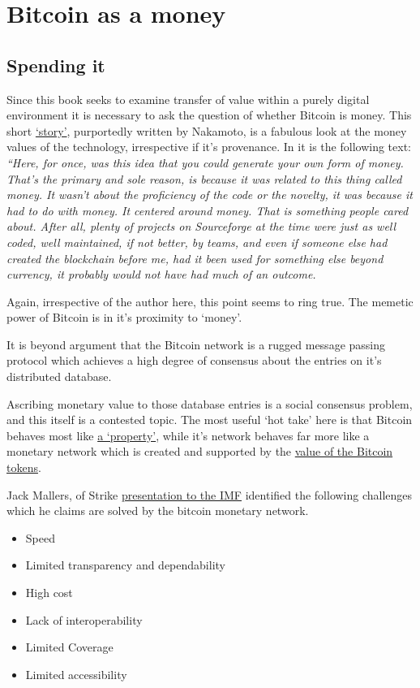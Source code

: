 \section{Bitcoin as a money}
\subsection{Spending it}
Since this book seeks to examine transfer of value within a purely digital environment it is necessary to ask the question of whether Bitcoin is money. This short \href{https://bitcoin-zar.blogspot.com/2018/07/duality-excerpt-by-satoshi-nakomoto.html}{`story'}, purportedly written by Nakamoto, is a fabulous look at the money values of the technology, irrespective if it's provenance. In it is the following text: \textit{``Here, for once, was this idea that you could generate your own form of money. That's the primary and sole reason, is because it was related to this thing called money. It wasn't about the proficiency of the code or the novelty, it was because it had to do with money. It centered around money. That is something people cared about. After all, plenty of projects on Sourceforge at the time were just as well coded, well maintained, if not better, by teams, and even if someone else had created the blockchain before me, had it been used for something else beyond currency, it probably would not have had much of an outcome.}\par
Again, irrespective of the author here, this point seems to ring true. The memetic power of Bitcoin is in it's proximity to `money'.\par
It is beyond argument that the Bitcoin network is a rugged message passing protocol which achieves a high degree of consensus about the entries on it's distributed database.\par Ascribing monetary value to those database entries is a social consensus problem, and this itself is a contested topic. The most useful `hot take' here is that Bitcoin behaves most like \href{https://twitter.com/saylor/status/1395788419301773312}{a `property'}, while it's network behaves far more like a monetary network which is created and supported by the \href{https://saito.tech/an-response-to-paul-krugman-from-a-keynesian-bitcoiner/}{value of the Bitcoin tokens}. \par
Jack Mallers, of Strike \href{https://www.youtube.com/watch?v=jb-45m9f76I}{presentation to the IMF} identified the following challenges which he claims are solved by the bitcoin monetary network.
\begin{itemize}
\item Speed
\item Limited transparency and dependability
\item High cost
\item Lack of interoperability
\item Limited Coverage
\item Limited accessibility
\end{itemize}
